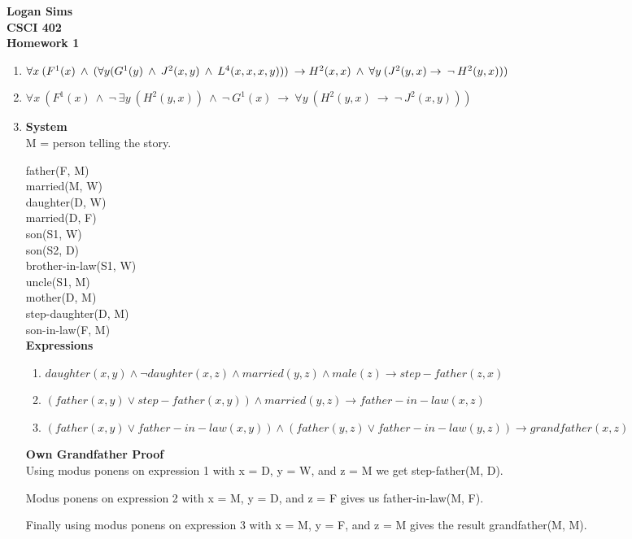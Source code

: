\documentclass[11pt]{article}
\begin{document}
\begin{center}
\textbf{Logan Sims \\ CSCI 402 \\ Homework 1  }
\end{center}

\begin{enumerate}[1.]
\item
$\forall x \: (F^1(x) \:\land\: (\forall y(G^1(y)\: \land\: J^2(x,y)\: \land\: L^4(x,x,x,y)))\: \rightarrow \newline H^2(x,x) \:\land\: \forall y\:(J^2(y,x) \rightarrow \:\lnot\: H^2(y,x)))$ 
\item
$\forall x\: (F^1(x) \:\land\: \lnot\: \exists y\: (H^2(y,x))\: \land\: \lnot\: G^1(x)\: \rightarrow\: \forall y\: (H^2(y,x)\: \rightarrow\: \lnot\: J^2(x,y)))$ 
\item
\textbf{System}\\
M = person telling the story.

father(F, M)\\
married(M, W)\\
daughter(D, W)\\
married(D, F)\\
son(S1, W)\\
son(S2, D)\\
brother-in-law(S1, W)\\
uncle(S1, M)\\
mother(D, M)\\
step-daughter(D, M)\\
son-in-law(F, M)\\
\textbf{Expressions}
\begin{enumerate}[1.]
\item
$daughter(x, y)\land \lnot daughter(x, z) \land married(y, z) \land male(z) \rightarrow step-father(z, x)$
\item
$(father(x, y) \lor step-father(x, y)) \land married (y, z) \rightarrow father-in-law(x, z)$
\item
$(father(x, y) \lor father-in-law(x, y)) \land (father(y, z) \lor father-in-law(y, z)) \rightarrow grandfather(x, z)$
\end{enumerate}
\textbf{Own Grandfather Proof}\\
Using modus ponens on expression 1 with x = D, y = W, and z = M we get step-father(M, D).

Modus ponens on expression 2 with x = M, y = D, and z = F gives us father-in-law(M, F).

Finally using modus ponens on expression 3 with x = M, y = F, and z = M gives the result grandfather(M, M).


\end{enumerate}
\end{document}
